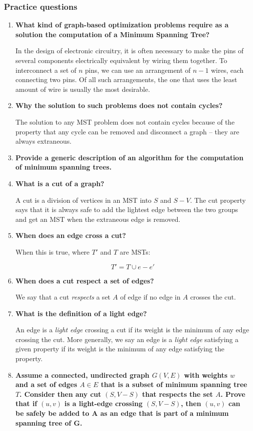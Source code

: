 \documentclass[a4paper,11pt]{article}
\begin{document}
\subsubsection{Practice questions}\label{practice-questions-17}

\begin{enumerate}
\def\labelenumi{\arabic{enumi}.}
\item
  \textbf{What kind of graph-based optimization problems require as a
  solution the computation of a Minimum Spanning Tree?}

  In the design of electronic circuitry, it is often necessary to make
  the pins of several components electrically equivalent by wiring them
  together. To interconnect a set of $n$ pins, we can use an arrangement
  of $n - 1$ wires, each connecting two pins. Of all such arrangements,
  the one that uses the least amount of wire is usually the most
  desirable.
\item
  \textbf{Why the solution to such problems does not contain cycles?}

  The solution to any MST problem does not contain cycles because of the
  property that any cycle can be removed and disconnect a graph -- they
  are always extraneous.
\item
  \textbf{Provide a generic description of an algorithm for the
  computation of minimum spanning trees.}
\item
  \textbf{What is a cut of a graph?}

  A cut is a division of vertices in an MST into $S$ and $S - V$. The
  cut property says that it is always safe to add the lightest edge
  between the two groups and get an MST when the extraneous edge is
  removed.
\item
  \textbf{When does an edge cross a cut?}

  When this is true, where $T'$ and $T$ are MSTs:

  \[T' = T \cup {e} - {e'}\]
\item
  \textbf{When does a cut respect a set of edges?}

  We say that a cut \emph{respects} a set $A$ of edge if no edge in $A$
  crosses the cut.
\item
  \textbf{What is the definition of a light edge?}

  An edge is a \emph{light edge} crossing a cut if its weight is the
  minimum of any edge crossing the cut. More generally, we say an edge
  is a \emph{light edge} satisfying a given property if its weight is
  the minimum of any edge satisfying the property.
\item
  \textbf{Assume a connected, undirected graph $G(V, E)$ with weights
  $w$ and a set of edges $A \in E$ that is a subset of minimum spanning
  tree $T$. Consider then any cut $(S, V - S)$ that respects the set
  $A$. Prove that if $(u, v)$ is a light-edge crossing $(S, V - S)$,
  then $(u, v)$ can be safely be added to A as an edge that is part of a
  minimum spanning tree of G.}


\end{enumerate}
\end{document}
